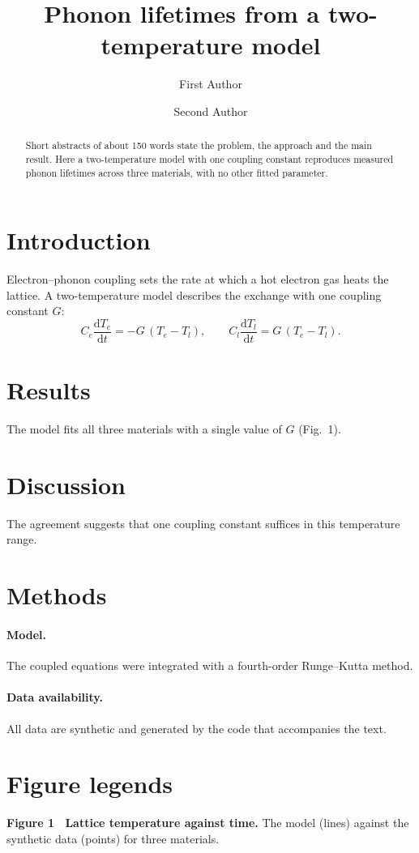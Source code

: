 \documentclass[11pt]{article}
\title{Phonon lifetimes from a two-temperature model}
\author[1]{First Author}
\author[1,2]{Second Author}
\affil[1]{Department of Physics, Example University}
\affil[2]{Institute for Test Documents}
\date{}
\begin{document}
\maketitle

\begin{abstract}
Short abstracts of about 150 words state the problem, the approach and the main result. Here a
two-temperature model with one coupling constant reproduces measured phonon lifetimes across three
materials, with no other fitted parameter.
\end{abstract}

\section{Introduction}
Electron--phonon coupling sets the rate at which a hot electron gas heats the lattice\cite{allen1987}. A
two-temperature model describes the exchange with one coupling constant $G$:
\begin{equation}
  C_e \frac{\mathrm{d}T_e}{\mathrm{d}t} = -G\,(T_e - T_l), \qquad
  C_l \frac{\mathrm{d}T_l}{\mathrm{d}t} = G\,(T_e - T_l).
\end{equation}

\section{Results}
The model fits all three materials with a single value of $G$ (Fig.~1)\cite{allen1987,ziman1960}.

\section{Discussion}
The agreement suggests that one coupling constant suffices in this temperature range\cite{ziman1960}.

\section{Methods}
\paragraph{Model.} The coupled equations were integrated with a fourth-order Runge--Kutta method.
\paragraph{Data availability.} All data are synthetic and generated by the code that accompanies the text.




\section*{Figure legends}
\textbf{Figure 1 \textbar\ Lattice temperature against time.} The model (lines) against the synthetic data
(points) for three materials.
\end{document}
